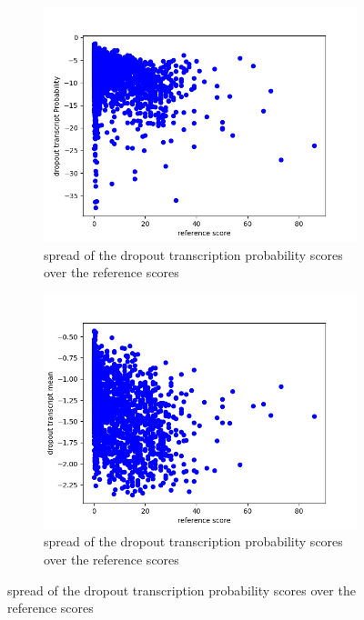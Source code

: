 \begin{figure}
    \centering
    \begin{subfigure}{0.4\linewidth}
        \includegraphics[width=\textwidth]{Latex/sections/images/seamlessdropouttranscript.png}
        \caption{spread of the dropout transcription probability scores over the reference scores}
    \end{subfigure}
    \begin{subfigure}{0.4\linewidth}
        \includegraphics[width=\textwidth]{Latex/sections/images/seamlessdropouttranscriptmean.png}
        \caption{spread of the dropout transcription probability scores over the reference scores}
    \end{subfigure}

\end{figure}
